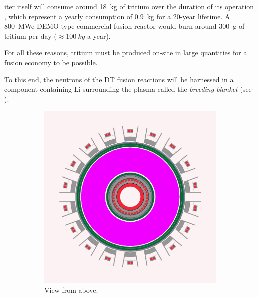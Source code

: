 \acrshort{iter} itself will consume around \SI{18}{kg} of tritium over the duration of its operation , which represent a yearly consumption of \SI{0.9}{kg} for a 20-year lifetime.
A \SI{800}{MWe} DEMO-type commercial fusion reactor would burn around \SI{300}{g} of tritium per day ($\approx \SI{100}{kg}$ a year).

For all these reasons, tritium must be produced on-site in large quantities for a fusion economy to be possible.

To this end, the neutrons of the DT fusion reactions will be harnessed in a component containing \gls{Li} surrounding the \gls{plasma} called the \emph{\gls{breeding blanket}} (see ).


\begin{figure}
    \centering
    \begin{subfigure}{0.45\linewidth}
        \includegraphics{Figures/Chapter1/blanket_shimwell_top_view.png}
        \caption{View from above.}
    \end{subfigure}%
    \qquad
    \begin{subfigure}{0.45\linewidth}

\end{subfigure}
\end{figure}
